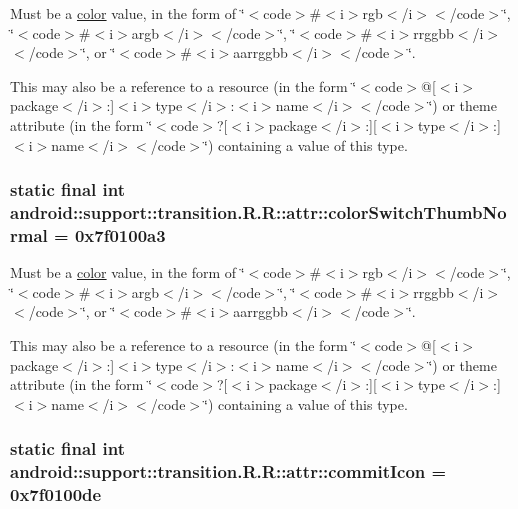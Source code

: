 Must be a \hyperlink{classandroid_1_1support_1_1transition_1_1_r_1_1color}{color} value, in the form of \char`\"{}$<$code$>$\#$<$i$>$rgb$<$/i$>$$<$/code$>$\char`\"{}, \char`\"{}$<$code$>$\#$<$i$>$argb$<$/i$>$$<$/code$>$\char`\"{}, \char`\"{}$<$code$>$\#$<$i$>$rrggbb$<$/i$>$$<$/code$>$\char`\"{}, or \char`\"{}$<$code$>$\#$<$i$>$aarrggbb$<$/i$>$$<$/code$>$\char`\"{}. 

This may also be a reference to a resource (in the form \char`\"{}$<$code$>$@\mbox{[}$<$i$>$package$<$/i$>$:\mbox{]}$<$i$>$type$<$/i$>$:$<$i$>$name$<$/i$>$$<$/code$>$\char`\"{}) or theme attribute (in the form \char`\"{}$<$code$>$?\mbox{[}$<$i$>$package$<$/i$>$:\mbox{]}\mbox{[}$<$i$>$type$<$/i$>$:\mbox{]}$<$i$>$name$<$/i$>$$<$/code$>$\char`\"{}) containing a value of this type. \hypertarget{classandroid_1_1support_1_1transition_1_1_r_1_1attr_436913ad7c5d6c1a04cdfabe76583940}{
\subsubsection[{colorSwitchThumbNormal}]{\setlength{\rightskip}{0pt plus 5cm}static final int android::support::transition.R.R::attr::colorSwitchThumbNormal = 0x7f0100a3}}
\label{classandroid_1_1support_1_1transition_1_1_r_1_1attr_436913ad7c5d6c1a04cdfabe76583940}


Must be a \hyperlink{classandroid_1_1support_1_1transition_1_1_r_1_1color}{color} value, in the form of \char`\"{}$<$code$>$\#$<$i$>$rgb$<$/i$>$$<$/code$>$\char`\"{}, \char`\"{}$<$code$>$\#$<$i$>$argb$<$/i$>$$<$/code$>$\char`\"{}, \char`\"{}$<$code$>$\#$<$i$>$rrggbb$<$/i$>$$<$/code$>$\char`\"{}, or \char`\"{}$<$code$>$\#$<$i$>$aarrggbb$<$/i$>$$<$/code$>$\char`\"{}. 

This may also be a reference to a resource (in the form \char`\"{}$<$code$>$@\mbox{[}$<$i$>$package$<$/i$>$:\mbox{]}$<$i$>$type$<$/i$>$:$<$i$>$name$<$/i$>$$<$/code$>$\char`\"{}) or theme attribute (in the form \char`\"{}$<$code$>$?\mbox{[}$<$i$>$package$<$/i$>$:\mbox{]}\mbox{[}$<$i$>$type$<$/i$>$:\mbox{]}$<$i$>$name$<$/i$>$$<$/code$>$\char`\"{}) containing a value of this type. \hypertarget{classandroid_1_1support_1_1transition_1_1_r_1_1attr_99e62bdad734b4cac9ffab3a6d854145}{
\subsubsection[{commitIcon}]{\setlength{\rightskip}{0pt plus 5cm}static final int android::support::transition.R.R::attr::commitIcon = 0x7f0100de}}
\label{classandroid_1_1support_1_1transition_1_1_r_1_1attr_99e62bdad734b4cac9ffab3a6d854145}


